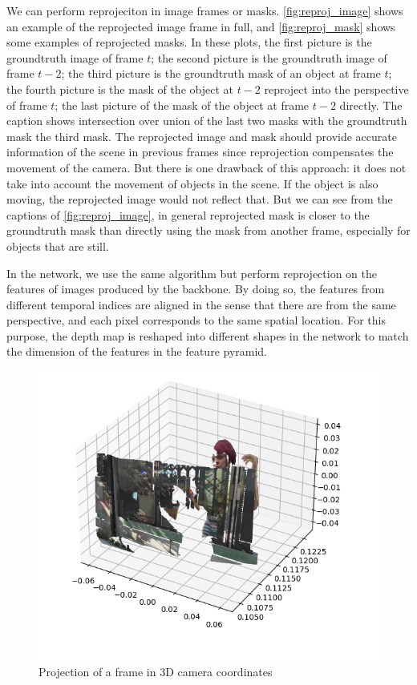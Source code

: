 We can perform reprojeciton in image frames or masks. \ref{fig:reproj_image} shows an example of the reprojected image frame in full, and \ref{fig:reproj_mask} shows some examples of reprojected masks. In these plots, the first picture is the groundtruth image of frame $t$; the second picture is the groundtruth image of frame $t-2$; the third picture is the groundtruth mask of an object at frame $t$; the fourth picture is the mask of the object at $t-2$ reproject into the perspective of frame $t$; the last picture of the mask of the object at frame $t-2$ directly. The caption shows intersection over union of the last two masks with the groundtruth mask \ie the third mask. The reprojected image and mask should provide accurate information of the scene in previous frames since reprojection compensates the movement of the camera. But there is one drawback of this approach: it does not take into account the movement of objects in the scene. If the object is also moving, the reprojected image would not reflect that. But we can see from the captions of \ref{fig:reproj_image}, in general reprojected mask is closer to the groundtruth mask than directly using the mask from another frame, especially for objects that are still. 

In the network, we use the same algorithm but perform reprojection on the features of images produced by the backbone. By doing so, the features from different temporal indices are aligned in the sense that there are from the same perspective, and each pixel corresponds to the same spatial location. For this purpose, the depth map is reshaped into different shapes in the network to match the dimension of the features in the feature pyramid.

\begin{figure}

\centering
\includegraphics[scale=0.5]{fig/3dproj.png}
\caption{Projection of a frame in 3D camera coordinates}
\label{fig:3Dproj}
\end{figure}


